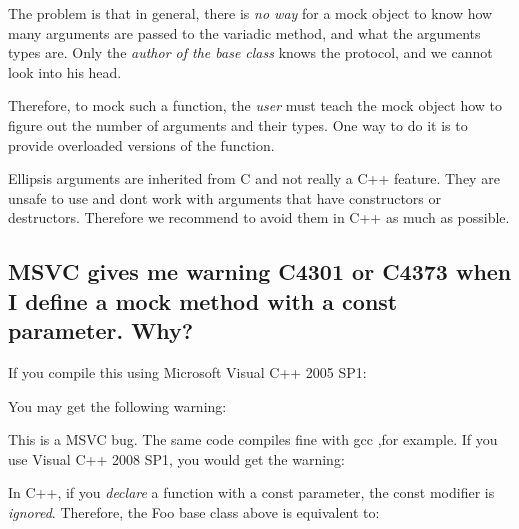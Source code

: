 The problem is that in general, there is {\itshape no way} for a mock object to know how many arguments are passed to the variadic method, and what the arguments\textquotesingle{} types are. Only the {\itshape author of the base class} knows the protocol, and we cannot look into his head.

Therefore, to mock such a function, the {\itshape user} must teach the mock object how to figure out the number of arguments and their types. One way to do it is to provide overloaded versions of the function.

Ellipsis arguments are inherited from C and not really a C++ feature. They are unsafe to use and don\textquotesingle{}t work with arguments that have constructors or destructors. Therefore we recommend to avoid them in C++ as much as possible.

\subsection*{M\+S\+VC gives me warning C4301 or C4373 when I define a mock method with a const parameter. Why?}

If you compile this using Microsoft Visual C++ 2005 S\+P1\+: 
\begin{DoxyCode}{0}
\DoxyCodeLine{\};}
\DoxyCodeLine{}
\DoxyCodeLine{\};}
\end{DoxyCode}
 You may get the following warning\+: 
\begin{DoxyCode}{0}
\end{DoxyCode}


This is a M\+S\+VC bug. The same code compiles fine with gcc ,for example. If you use Visual C++ 2008 S\+P1, you would get the warning\+: 
\begin{DoxyCode}{0}
\end{DoxyCode}


In C++, if you {\itshape declare} a function with a {\ttfamily const} parameter, the {\ttfamily const} modifier is {\itshape ignored}. Therefore, the {\ttfamily Foo} base class above is equivalent to\+: 
\begin{DoxyCode}{0}
\DoxyCodeLine{\};}
\end{DoxyCode}


